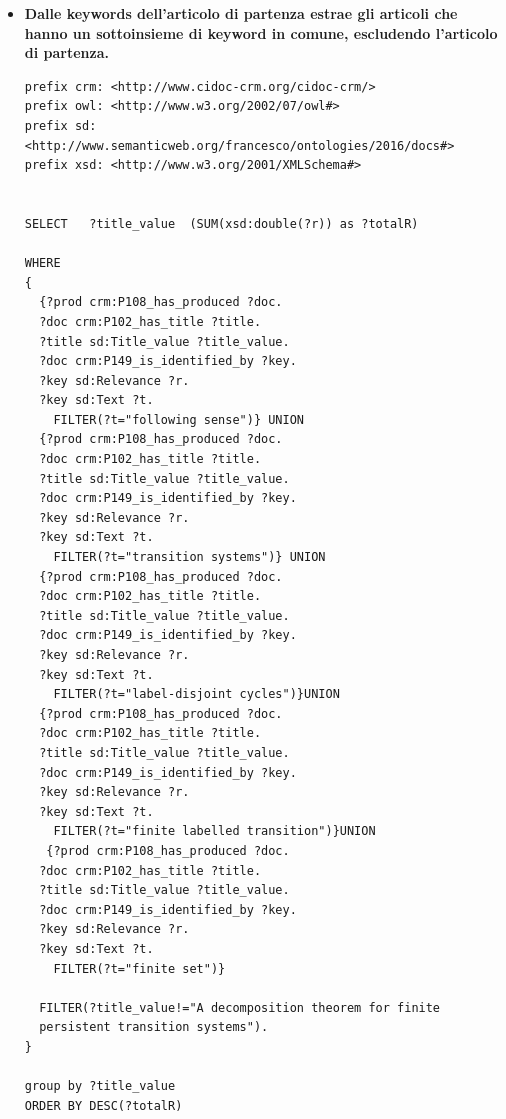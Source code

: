 \documentclass[11pt,a4paper]{article}
\begin{document}
\begin{itemize}
\item \textbf{Dalle keywords dell'articolo di partenza estrae gli articoli che hanno un sottoinsieme di keyword in comune, escludendo l'articolo di partenza.}
\begin{lstlisting}[breaklines=true]
prefix crm: <http://www.cidoc-crm.org/cidoc-crm/>
prefix owl: <http://www.w3.org/2002/07/owl#>
prefix sd: <http://www.semanticweb.org/francesco/ontologies/2016/docs#>
prefix xsd: <http://www.w3.org/2001/XMLSchema#>


SELECT   ?title_value  (SUM(xsd:double(?r)) as ?totalR) 

WHERE
{
  {?prod crm:P108_has_produced ?doc.
  ?doc crm:P102_has_title ?title.
  ?title sd:Title_value ?title_value.
  ?doc crm:P149_is_identified_by ?key.
  ?key sd:Relevance ?r.
  ?key sd:Text ?t.
    FILTER(?t="following sense")} UNION 
  {?prod crm:P108_has_produced ?doc.
  ?doc crm:P102_has_title ?title.
  ?title sd:Title_value ?title_value.
  ?doc crm:P149_is_identified_by ?key.
  ?key sd:Relevance ?r.
  ?key sd:Text ?t.
    FILTER(?t="transition systems")} UNION
  {?prod crm:P108_has_produced ?doc.
  ?doc crm:P102_has_title ?title.
  ?title sd:Title_value ?title_value.
  ?doc crm:P149_is_identified_by ?key.
  ?key sd:Relevance ?r.
  ?key sd:Text ?t.
    FILTER(?t="label-disjoint cycles")}UNION
  {?prod crm:P108_has_produced ?doc.
  ?doc crm:P102_has_title ?title.
  ?title sd:Title_value ?title_value.
  ?doc crm:P149_is_identified_by ?key.
  ?key sd:Relevance ?r.
  ?key sd:Text ?t.
    FILTER(?t="finite labelled transition")}UNION
   {?prod crm:P108_has_produced ?doc.
  ?doc crm:P102_has_title ?title.
  ?title sd:Title_value ?title_value.
  ?doc crm:P149_is_identified_by ?key.
  ?key sd:Relevance ?r.
  ?key sd:Text ?t.
    FILTER(?t="finite set")}
  
  FILTER(?title_value!="A decomposition theorem for finite 
  persistent transition systems").
}

group by ?title_value
ORDER BY DESC(?totalR) 
\end{lstlisting}
\end{itemize}
\end{document}
